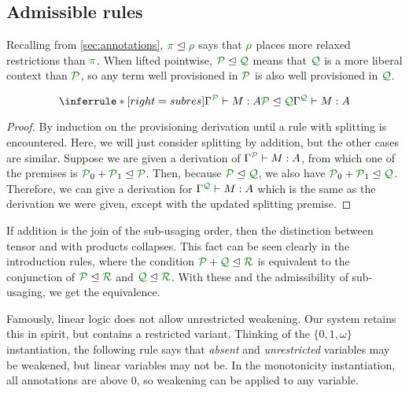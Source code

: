 \subsection{Admissible rules}
\label{sec:admissible}


Recalling from \autoref{sec:annotations}, $\rescomment \pi \subres \rescomment
\rho$ says that $\rescomment \rho$ places more relaxed restrictions than
$\rescomment \pi$.
When lifted pointwise, $\resctx P \subres \resctx Q$ means that
$\resctx Q$ is a more liberal context than $\resctx
 P$, so any term well provisioned in $\resctx P$ is also well
provisioned in $\resctx Q$.

\begin{lemma}
  \label{lem:subres}
  \[
    \inferrule*[right=subres]{
      \ctx{\Gamma}{P} \vdash M : A
      \\ \resctx P \subres \resctx Q
    }
    {
      \ctx{\Gamma}{Q} \vdash M : A
    }
  \]
\end{lemma}
\begin{proof}
  By induction on the provisioning derivation until a rule with splitting is
  encountered.
  Here, we will just consider splitting by addition, but the other cases are
  similar.
  Suppose we are given a derivation of $\ctx{\Gamma}{P} \vdash M : A$,
  from which one of the premises is
  $\resctx P_0 + \resctx P_1 \subres \resctx P$.
  Then, because $\resctx P \subres \resctx Q$, we also have
  $\resctx P_0 + \resctx P_1 \subres \resctx Q$.
  Therefore, we can give a derivation for
  $\ctx{\Gamma}{Q} \vdash M : A$ which is the same as the derivation we
  were given, except with the updated splitting premise.
\end{proof}

If addition is the join of the sub-usaging order, then the distinction
between tensor and with products collapses.
This fact can be seen clearly in the introduction rules, where the condition
$\resctx P + \resctx Q \subres \resctx R$ is equivalent to the conjunction of
$\resctx P \subres \resctx R$ and $\resctx Q \subres \resctx R$.
With these and the admissibility of sub-usaging, we get the equivalence.

Famously, linear logic does not allow unrestricted weakening.
Our system retains this in spirit, but contains a restricted variant.
Thinking of the $\{0,1,\omega\}$ instantiation, the following rule says that
\emph{absent} and \emph{unrestricted} variables may be weakened, but linear
variables may not be.
In the monotonicity instantiation, all annotations are above $0$, so weakening
can be applied to any variable.

